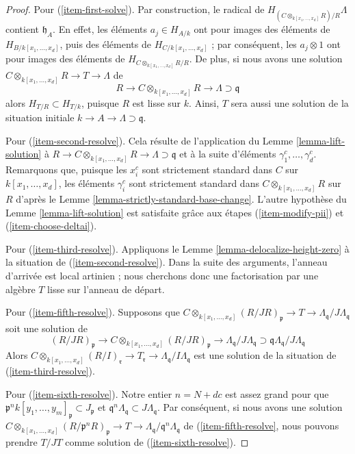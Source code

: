 \begin{proof}
\medskip\noindent
Pour (\ref{item-first-solve}). Par construction, le radical de
$H_{(C \otimes_{k[x_1, \ldots, x_d]} R)/R} \Lambda$ contient
$\mathfrak h_A$. En effet, les éléments $a_j \in H_{A/k}$
ont pour images des éléments de $H_{B/k[x_1, \ldots, x_d]}$, puis des éléments
de $H_{C/k[x_1, \ldots, x_d]}$ ; par conséquent, les $a_j \otimes 1$ ont pour images des éléments de
$H_{C \otimes_{k[x_1, \ldots, x_d]} R/R}$. De plus, si nous avons une solution
$C \otimes_{k[x_1, \ldots, x_d]} R \to T \to \Lambda$ de
$$
R
\to
C \otimes_{k[x_1, \ldots, x_d]} R
\to
\Lambda \supset \mathfrak q
$$
alors $H_{T/R} \subset H_{T/k}$, puisque $R$ est lisse sur $k$.
Ainsi, $T$ sera aussi une solution de
la situation initiale $k \to A \to \Lambda \supset \mathfrak q$.

\medskip\noindent
Pour (\ref{item-second-resolve}). Cela résulte de l'application du
Lemme \ref{lemma-lift-solution} à
$R \to C \otimes_{k[x_1, \ldots, x_d]} R
\to \Lambda \supset \mathfrak q$ et à la suite d'éléments
$\gamma_1^c, \ldots, \gamma_d^c$. Remarquons que, puisque les $x_i^c$
sont strictement standard dans $C$ sur $k[x_1, \ldots, x_d]$, les éléments
$\gamma_i^c$ sont strictement standard dans $C \otimes_{k[x_1, \ldots, x_d]} R$
sur $R$ d'après le Lemme \ref{lemma-strictly-standard-base-change}.
L'autre hypothèse du Lemme \ref{lemma-lift-solution} est satisfaite grâce aux étapes
(\ref{item-modify-pii}) et (\ref{item-choose-deltai}).

\medskip\noindent
Pour (\ref{item-third-resolve}). Appliquons le Lemme \ref{lemma-delocalize-height-zero}
à la situation de (\ref{item-second-resolve}). Dans la suite des
arguments, l'anneau d'arrivée est local artinien ; nous cherchons donc
une factorisation par une algèbre $T$ lisse sur l'anneau de départ.

\medskip\noindent
Pour (\ref{item-fifth-resolve}).
Supposons que $C \otimes_{k[x_1, \ldots, x_d]} (R/JR)_\mathfrak p \to
T \to \Lambda_\mathfrak q/J\Lambda_\mathfrak q$ soit une solution de
$$
(R/JR)_\mathfrak p \to
C \otimes_{k[x_1, \ldots, x_d]} (R/JR)_\mathfrak p \to
\Lambda_\mathfrak q/J\Lambda_\mathfrak q
\supset
\mathfrak q\Lambda_\mathfrak q/J\Lambda_\mathfrak q
$$
Alors $C \otimes_{k[x_1, \ldots, x_d]} (R/I)_\mathfrak r \to T_\mathfrak r \to
\Lambda_\mathfrak q/I\Lambda_\mathfrak q$
est une solution de la situation de (\ref{item-third-resolve}).

\medskip\noindent
Pour (\ref{item-sixth-resolve}). Notre entier $n = N + dc$ est assez grand pour que
$\mathfrak p^nk[y_1, \ldots, y_m]_\mathfrak p \subset J_\mathfrak p$
et $\mathfrak q^n \Lambda_\mathfrak q \subset J\Lambda_\mathfrak q$.
Par conséquent, si nous avons une solution
$C \otimes_{k[x_1, \ldots, x_d]} (R/\mathfrak p^nR)_\mathfrak p \to
T \to \Lambda_\mathfrak q/\mathfrak q^n\Lambda_\mathfrak q$
de (\ref{item-fifth-resolve},
nous pouvons prendre $T/JT$ comme solution de
(\ref{item-sixth-resolve}).


\end{proof}

